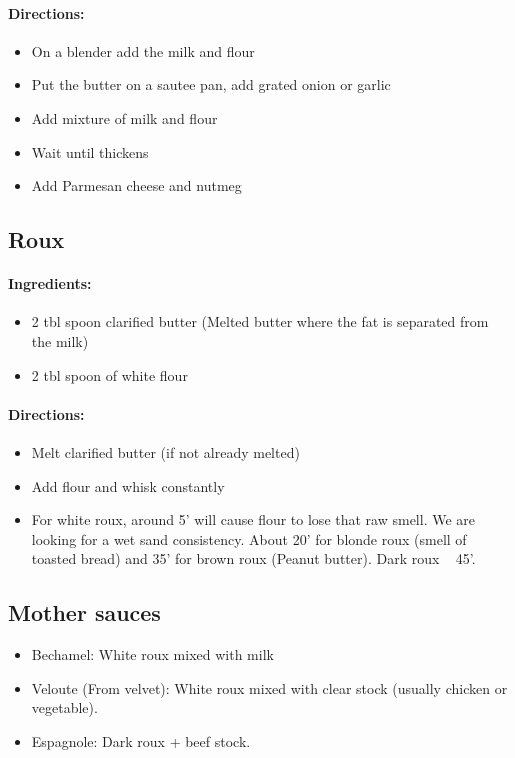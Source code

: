 \documentclass{article}
\begin{document}
\paragraph{Directions:}
\begin{itemize}
	\item On a blender add the milk and flour
	\item Put the butter on a sautee pan, add grated onion or garlic
	\item Add mixture of milk and flour
	\item Wait until thickens
	\item Add Parmesan cheese and nutmeg
\end{itemize}

\subsection{Roux}

\paragraph{Ingredients:}

\begin{itemize}
	\item 2 tbl spoon clarified butter (Melted butter where the fat is separated from the milk)
	\item 2 tbl spoon of white flour
\end{itemize}

\paragraph{Directions:}
\begin{itemize}
	\item Melt clarified butter (if not already melted)
	\item Add flour and whisk constantly
	\item For white roux, around 5' will cause flour to lose that raw smell. We are looking for a wet sand consistency. About 20' for blonde roux (smell of toasted bread) and 35' for brown roux (Peanut butter). Dark roux ~ 45'.
\end{itemize}

\subsection{Mother sauces}
\begin{itemize}
	\item Bechamel: White roux mixed with milk
	\item Veloute (From velvet): White roux mixed with clear stock (usually chicken or vegetable).
	\item Espagnole: Dark roux + beef stock.
\end{itemize}
\end{document}
